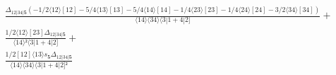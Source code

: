 \documentclass[varwidth, border=5pt]{standalone}
\begin{document}
\begin{my}
$\begin{gathered}
\scriptscriptstyle\frac{Δ_{12|34|𝟓}(-1/2⟨12⟩[12]-5/4⟨13⟩[13]-5/4⟨14⟩[14]-1/4⟨23⟩[23]-1/4⟨24⟩[24]-3/2⟨34⟩[34])}{⟨14⟩⟨34⟩⟨3|1+4|2]} +\\
\scriptscriptstyle\frac{1/2⟨12⟩[23]Δ_{12|34|𝟓}}{⟨14⟩²⟨3|1+4|2]} +\\
\scriptscriptstyle\frac{1/2[12]⟨13⟩s_{𝟓}Δ_{12|34|𝟓}}{⟨14⟩⟨34⟩⟨3|1+4|2]²} \phantom{+}
\end{gathered}$
\end{my}
\end{document}
